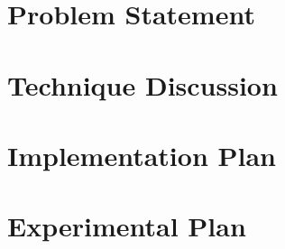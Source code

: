 \section{Problem Statement}



\section{Technique Discussion}



\section{Implementation Plan}



\section{Experimental Plan}





